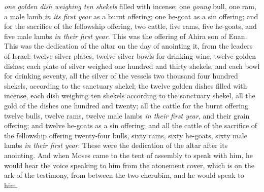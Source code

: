 \begin{biblechapter}
\verse \textit{one golden dish weighing ten shekels} filled with incense;
\verse one \textit{young} bull, one ram, a male lamb \textit{in its first year} as a burnt offering;
\verse one he-goat as a sin offering;
\verse and for the sacrifice of the fellowship offering, two cattle, five rams, five he-goats, and five male lambs \textit{in their first year}. This was the offering of Ahira son of Enan.
\verse This was the dedication of the altar on the day of anointing it, from the leaders of Israel: twelve silver plates, twelve silver bowls for drinking wine, twelve golden dishes;
\verse each plate of silver weighed one hundred and thirty shekels, and each bowl for drinking seventy, all the silver of the vessels two thousand four hundred shekels, according to the sanctuary shekel;
\verse the twelve golden dishes filled with incense, each dish weighing ten shekels according to the sanctuary shekel, all the gold of the dishes one hundred and twenty;
\verse all the cattle for the burnt offering twelve bulls, twelve rams, twelve male lambs \textit{in their first year}, and their grain offering; and twelve he-goats as a sin offering;
\verse and all the cattle of the sacrifice of the fellowship offering twenty-four bulls, sixty rams, sixty he-goats, sixty male lambs \textit{in their first year}. These were the dedication of the altar after its anointing.
\verse And when Moses came to the tent of assembly to speak with him, he would hear the voice speaking to him from the atonement cover, which is on the ark of the testimony, from between the two cherubim, and he would speak to him.
\end{biblechapter}

